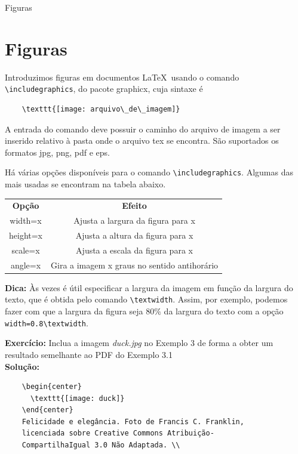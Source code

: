 \documentclass[12pt]{beamer}
\begin{document}
\begin{frame}[fragile]{Figuras}
  \section{Figuras}
  Introduzimos figuras em documentos \LaTeX\ usando o comando \verb+\includegraphics+, do pacote graphicx, cuja sintaxe é
  \begin{verbatim}
    \texttt{[image: arquivo\_de\_imagem]}
  \end{verbatim}

  A entrada do comando deve possuir o caminho do arquivo de imagem a ser inserido relativo à pasta onde o arquivo tex se encontra. São suportados os formatos jpg, png, pdf e eps.

\end{frame}

\begin{frame}[fragile]
  Há várias opções disponíveis para o comando \verb+\includegraphics+. Algumas das mais usadas se encontram na tabela abaixo.
  \begin{center}
    \begin{tabular}{cc}
      \textbf{Opção} & \textbf{Efeito} \\
      width=x & Ajusta a largura da figura para x\\
      height=x & Ajusta a altura da figura para x\\
      scale=x & Ajusta a escala da figura para x\\
      angle=x & Gira a imagem x graus no sentido
      antihorário
    \end{tabular}
  \end{center}

  \textbf{Dica: } Às vezes é útil especificar a largura da imagem em função da largura do texto, que é obtida pelo comando \verb+\textwidth+. Assim, por exemplo, podemos fazer com que a largura da figura seja $80 \%$ da largura do texto com a opção \verb+width=0.8\textwidth+.
\end{frame}

\begin{frame}[fragile]

  \textbf{Exercício: } Inclua a imagem \emph{duck.jpg} no Exemplo 3 de forma a obter um resultado semelhante ao PDF do Exemplo 3.1\\
  \bigskip
  \pause
  \textbf{Solução: }
  \begin{verbatim}
    \begin{center}
      \texttt{[image: duck]}
    \end{center}
    Felicidade e elegância. Foto de Francis C. Franklin,
    licenciada sobre Creative Commons Atribuição-
    CompartilhaIgual 3.0 Não Adaptada. \\
  \end{verbatim}

\end{frame}
\end{document}
